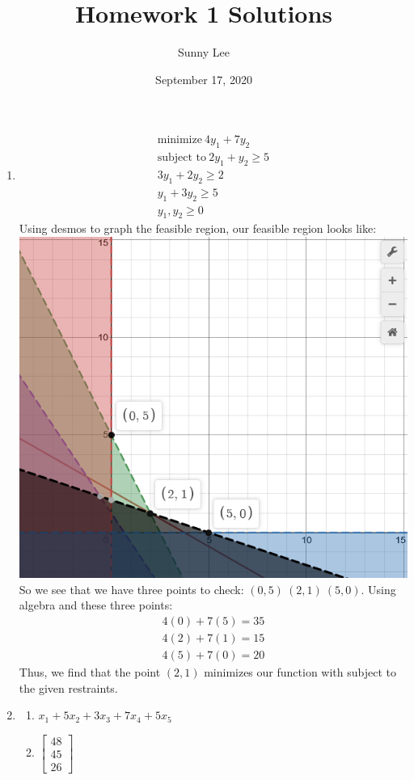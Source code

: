 \documentclass{article}
\title{Homework 1 Solutions}
\author{Sunny Lee}
\date{September 17, 2020}
\begin{document}
\begin{enumerate}
    \item 
    \begin{gather*}
        \text{minimize} \  4y_1+7y_2\\
        \text{subject to} \ 2y_1 + y_2 \geq 5\\
        3y_1+2y_2 \geq 2\\
        y_1 + 3y_2 \geq 5\\
        y_1, y_2 \geq 0
    \end{gather*}
    Using desmos to graph the feasible region, our feasible region looks like:\\
    \includegraphics{1a.png}\\
    So we see that we have three points to check: $(0, 5) \ (2, 1) \ (5, 0)$. Using 
    algebra and these three points: 
    \begin{gather*}
        4(0) + 7(5) = 35\\
        4(2) + 7(1) = 15\\
        4(5) + 7(0) = 20
    \end{gather*}
    Thus, we find that the point $(2, 1)$ minimizes our function with subject to the 
    given restraints. 

    \item 
    \begin{enumerate}
        \item $x_1 + 5x_2 + 3x_3 + 7 x_4 + 5x_5$
        \item $
        \begin{bmatrix}
            48 \\ 
            45 \\
            26
        \end{bmatrix}
        $
    \end{enumerate}


\end{enumerate}
\end{document}
